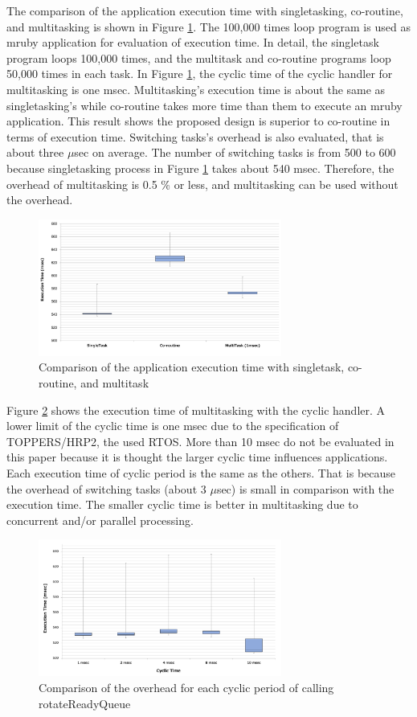 \documentclass[conference,compsoc]{IEEEtran}
\begin{document}
The comparison of the application execution time with singletasking, co-routine, and multitasking is shown in Figure \ref{fig:comparison_s_c_m}.
The 100,000 times loop program is used as mruby application for evaluation of execution time.
In detail, the singletask program loops 100,000 times, and the multitask and co-routine programs loop 50,000 times in each task.
In Figure \ref{fig:comparison_s_c_m}, the cyclic time of the cyclic handler for multitasking is one msec.
Multitasking's execution time is about the same as singletasking's while co-routine takes more time than them to execute an mruby application.
This result shows the proposed design is superior to co-routine in terms of execution time.
Switching tasks's overhead is also evaluated, that is about three $\mu$sec on average.
The number of switching tasks is from 500 to 600 because singletasking process in Figure \ref{fig:comparison_s_c_m} takes about 540 msec.
Therefore, the overhead of multitasking is 0.5 \% or less, and multitasking can be used without the overhead.

\begin{figure}[t]
    \centering
    \includegraphics[width=8cm,clip]{figure/comparison_s_c_m.pdf}
    \caption{Comparison of the application execution time with singletask, co-routine, and multitask}
    \label{fig:comparison_s_c_m}
\end{figure}

Figure \ref{fig:comparison_msec} shows the execution time of multitasking with the cyclic handler.
A lower limit of the cyclic time is one msec due to the specification of TOPPERS/HRP2, the used RTOS.
More than 10 msec do not be evaluated in this paper because it is thought the larger cyclic time influences applications.
Each execution time of cyclic period is the same as the others.
That is because the overhead of switching tasks (about 3 $\mu$sec) is small in comparison with the execution time.
The smaller cyclic time is better in multitasking due to concurrent and/or parallel processing.

\begin{figure}[t]
    \centering
    \includegraphics[width=8cm,clip]{figure/comparison_msec.pdf}
    \caption{Comparison of the overhead for each cyclic period of calling rotateReadyQueue}
    \label{fig:comparison_msec}
\end{figure}
 
\end{document}
